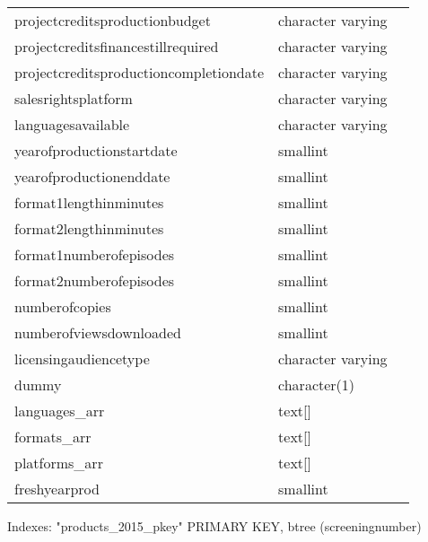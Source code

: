 \documentclass[a4paper,11pt]{article}
\begin{document}
\begin{tabular}{lll}
 projectcreditsproductionbudget         & character varying & \\ 
 projectcreditsfinancestillrequired     & character varying & \\ 
 projectcreditsproductioncompletiondate & character varying & \\ 
 salesrightsplatform                    & character varying & \\ 
 languagesavailable                     & character varying & \\ 
 yearofproductionstartdate              & smallint          & \\ 
 yearofproductionenddate                & smallint          & \\ 
 format1lengthinminutes                 & smallint          & \\ 
 format2lengthinminutes                 & smallint          & \\ 
 format1numberofepisodes                & smallint          & \\ 
 format2numberofepisodes                & smallint          & \\ 
 numberofcopies                         & smallint          & \\ 
 numberofviewsdownloaded                & smallint          & \\ 
 licensingaudiencetype                  & character varying & \\ 
 dummy                                  & character(1)      & \\ 
 languages\_arr                          & text[]            & \\ 
 formats\_arr                            & text[]            & \\ 
 platforms\_arr                          & text[]            & \\ 
 freshyearprod                          & smallint          &
\end{tabular}

Indexes:
    "products\_2015\_pkey" PRIMARY KEY, btree (screeningnumber)
\end{document}
